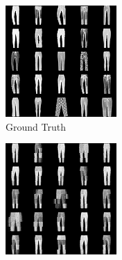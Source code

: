 \begin{figure}[H]
    \centering
    \begin{subfigure}[b]{0.24\textwidth}
        \centering
        \includegraphics[width=\textwidth]{figures/einsum/1fashion-mnist_ground_truth.png}
        \caption{Ground Truth}
    \end{subfigure}
    \begin{subfigure}[b]{0.24\textwidth}
        \centering
        \includegraphics[width=\textwidth]{figures/einsum/1fashion-mnist_EM.png}

\end{subfigure}
\end{figure}
